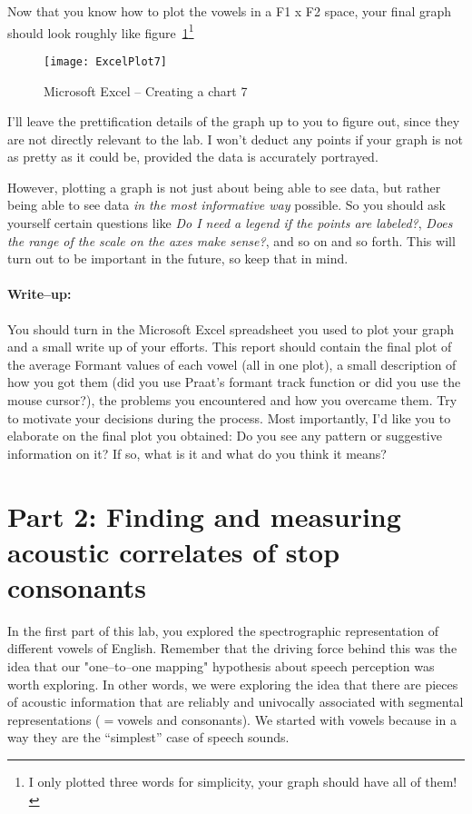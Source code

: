 \documentclass{article}
\newcommand{\soft}[1]{\textsf{#1}}
\newcommand{\MSExcel}{\soft{Microsoft\texttrademark{} Excel}}
\begin{document}
Now that you know how to plot the vowels in a F1 x F2 space, your final graph should look roughly like figure~\ref{step6plot}\footnote{I only plotted three words for simplicity, your graph should have all of them!}

\begin{figure}[!tbp]
\caption{\MSExcel{} -- Creating a chart 7}
\label{step6plot}
	\begin{center}
		\texttt{[image: ExcelPlot7]}
	\end{center}
\end{figure}

I'll leave the prettification details of the graph up to you to figure out, since they are not directly relevant to the lab. I won't deduct any points if your graph is not as pretty as it could be, provided the data is accurately portrayed.

However, plotting a graph is not just about being able to see data, but rather being able to see data \emph{in the most informative way} possible. So you should ask yourself certain questions like \emph{Do I need a legend if the points are labeled?}, \emph{Does the range of the scale on the axes make sense?}, and so on and so forth. This will turn out to be important in the future, so keep that in mind.

\paragraph{Write--up:} You should turn in the \MSExcel{} spreadsheet you used to plot your graph and a small write up of your efforts. This report should contain the final plot of the average Formant values of each vowel (all in one plot), a small description of how you got them (did you use Praat's formant track function or did you use the mouse cursor?), the problems you encountered and how you overcame them. Try to motivate your decisions during the process. Most importantly, I'd like you to elaborate on the final plot you obtained: Do you see any pattern or suggestive information on it? If so, what is it and what do you think it means?




\section{Part 2: Finding and measuring acoustic correlates of stop consonants}

In the first part of this lab, you explored the spectrographic representation of different vowels of English. Remember that the driving force behind this was the idea that our "one--to--one mapping" hypothesis about speech perception was worth exploring. In other words, we were exploring the idea that there are pieces of acoustic information that are reliably and univocally associated with segmental representations ($=$vowels and consonants). We started with vowels because in a way they are the ``simplest'' case of speech sounds.
\end{document}
